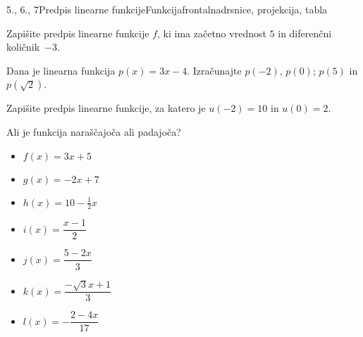 \begin{priprava}{5., 6., 7}{}{Predpis linearne funkcije}{Funkcija}{frontalna}{drsnice, projekcija, tabla}
        
            \begin{naloga}
                Zapišite predpis linearne funkcije $f$, ki ima začetno vrednost $5$ in diferenčni količnik~$-3$. 
            \end{naloga}

            \begin{naloga}
                Dana je linearna funkcija $p(x)=3x-4$. Izračunajte $p(-2)$, $p(0)$; $p(5)$ in $p(\sqrt{2})$. 
            \end{naloga}

            \begin{naloga}
                Zapišite predpis linearne funkcije, za katero je $u(-2)=10$ in $u(0)=2$. 
            \end{naloga}

        


        
            \begin{naloga}
                Ali je funkcija naraščajoča ali padajoča?
                \begin{multicols}{2}
                    \begin{itemize}
                        \item $f(x)=3x+5$ 
                        \item $g(x)=-2x+7$ 
                        \item $h(x)=10-\frac{1}{2}x$ 
                        \item $i(x)=\dfrac{x-1}{2}$ 
                        \item $j(x)=\dfrac{5-2x}{3}$ 
                        \item $k(x)=\dfrac{-\sqrt{3}x+1}{3}$ 
                        \item $l(x)=-\dfrac{2-4x}{17}$ 
                    \end{itemize}
                \end{multicols}
            \end{naloga}
        



\end{priprava}

